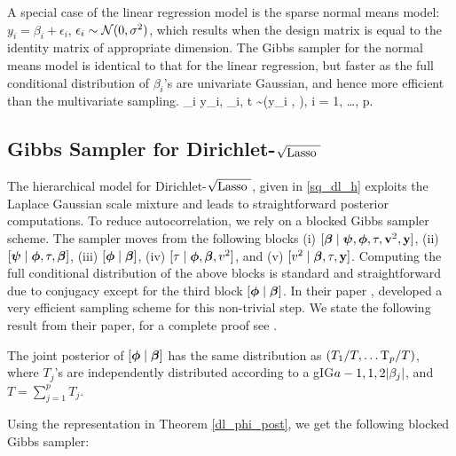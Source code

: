 \documentclass[10pt]{article}
\def\sqdl{Dirichlet-$\sqrt{\text{\rm{Lasso} }}$}
\begin{document}
A special case of the linear regression model is the sparse normal means model: $y_i = \beta_i + \epsilon_i$, $\epsilon_i \sim \mathcal{N}(0,\sigma^2)$, which results when the design matrix is equal to the identity matrix of appropriate dimension. The Gibbs sampler for the normal means model is identical to that for the linear regression, but faster as the full conditional distribution of $\beta_i$'s are univariate Gaussian, and hence more efficient than the multivariate sampling. 
\beq \label{BSQ_NM}
\beta_i \mid y_i, \lambda_i, t \sim \NormRV \left(y_i ,  \right), i = 1, \ldots, p.
\eeq

\subsection{Gibbs Sampler for \sqdl{}}\label{subsec:comp-dl}

The hierarchical model for \sqdl{}, given in \eqref{sq_dl_h} exploits the Laplace Gaussian scale mixture and leads to straightforward posterior computations. To reduce autocorrelation, we rely on a blocked Gibbs sampler scheme. The sampler moves from the following blocks \rm{(i)} $ [ \boldsymbol{\beta} \mid \boldsymbol{\psi} , \boldsymbol{\phi} , \tau , {\bf v}^2 , {\bf y} ] $, \rm{(ii)} $[\boldsymbol{\psi} \mid \boldsymbol{\phi} , \tau , \boldsymbol{\beta}]$, \rm{(iii)}   $[ \boldsymbol{\phi} \mid \boldsymbol{\beta}]$, \rm{(iv)} $[ \tau \mid \boldsymbol{\phi}, \boldsymbol{\beta}, v^2 ]$, and \rm{(v)} $[ v^2 \mid \boldsymbol{\beta} ,\tau , {\bf y} ]  $. Computing the full conditional distribution of the above blocks is standard and straightforward due to conjugacy except for the third block $[ \boldsymbol{\phi} \mid \boldsymbol{\beta}]$. In their paper \citet{bhattacharya2014dirichlet}, developed a very efficient sampling scheme for this non-trivial step. We state the following result from their paper, for a complete proof see \citep{bhattacharya2014dirichlet}.


\begin{theorem}\label{dl_phi_post}
The joint posterior of $[\boldsymbol{\phi} \mid \boldsymbol{\beta} ]$ has the same distribution as $ \left( T_1/T, \ldots {\rm T}_p/T \right)$, where $T_j$'s are independently distributed according to a \rm{gIG}$a-1 , 1 , 2\lvert\beta_j\rvert$, and $T = \sum_{j=1}^{p}T_j$. 
\end{theorem}



Using the representation in Theorem \ref{dl_phi_post}, we get the following blocked Gibbs sampler:
\end{document}
